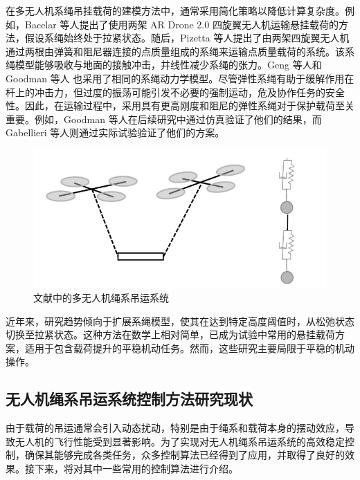 \documentclass[lang=chs, degree=master, blindreview=true, winfonts=true]{yanputhesis}
\begin{document}

在多无人机系绳吊挂载荷的建模方法中，通常采用简化策略以降低计算复杂度。例如，Bacelar 等人\cite{bacelar2020board}提出了使用两架 AR Drone 2.0 四旋翼无人机运输悬挂载荷的方法，假设系绳始终处于拉紧状态。随后，Pizetta 等人提出了由两架四旋翼无人机通过两根由弹簧和阻尼器连接的点质量组成的系绳来运输点质量载荷的系统。该系绳模型能够吸收与地面的接触冲击，并线性减少系绳的张力。Geng 等人\cite{geng2020cooperative}和 Goodman 等人\cite{goodman2023geometric} 也采用了相同的系绳动力学模型。尽管弹性系绳有助于缓解作用在杆上的冲击力，但过度的振荡可能引发不必要的强制运动，危及协作任务的安全性。因此，在运输过程中，采用具有更高刚度和阻尼的弹性系绳对于保护载荷至关重要。例如，Goodman 等人\cite{goodman2022geometric}在后续研究中通过仿真验证了他们的结果，而 Gabellieri 等人\cite{gabellieri2023equilibria}则通过实际试验验证了他们的方案。

\begin{figure}[hbt!]
	\centering
	\includegraphics[width=28pc]{picture/1_8.png} 
	\caption{文献中的多无人机绳系吊运系统} \label{1_8}
\end{figure}
近年来，研究趋势倾向于扩展系绳模型，使其在达到特定高度阈值时，从松弛状态切换至拉紧状态\cite{rao2023integrated,arab2022cooperative,doakhan2023robust,mohammadi2021passivity}。这种方法在数学上相对简单，已成为试验中常用的悬挂载荷方案，适用于包含载荷提升的平稳机动任务。然而，这些研究主要局限于平稳的机动操作。

\subsection{无人机绳系吊运系统控制方法研究现状}
由于载荷的吊运通常会引入动态扰动，特别是由于绳系和载荷本身的摆动效应，导致无人机的飞行性能受到显著影响。为了实现对无人机绳系吊运系统的高效稳定控制，确保其能够完成各类任务，众多控制算法已经得到了应用，并取得了良好的效果。接下来，将对其中一些常用的控制算法进行介绍。
\end{document}
